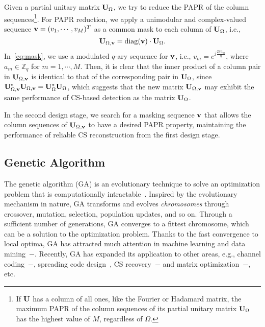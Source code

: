 \documentclass[journal]{IEEEtran}
\newcommand{\Z}{\ensuremath{\mathbb Z}}
\newcommand{\vbu}{{\bf v}}
\newcommand{\Ubu}{{\bf U}}
\numberwithin{const2}{const}
\begin{document}
Given a partial unitary matrix $\Ubu_\Omega$, 
we try to reduce the PAPR of
the column sequences\footnote{
If $\Ubu$ has a column of all ones, like the Fourier or Hadamard matrix,
the maximum PAPR of the column sequences of its partial unitary matrix $\Ubu_\Omega$ has the highest value of $M$,
regardless of $\Omega$.}.
For PAPR reduction, we apply
a unimodular and complex-valued sequence $\vbu = (v_1, \cdots, v_{M})^T$   
as a common mask to each column of $\Ubu_\Omega$, i.e.,
\begin{equation}\label{eq:mask}
\Ubu_{\Omega, \vbu}  
= {\rm diag} (\vbu) \cdot \Ubu_\Omega.
\end{equation}
In~\eqref{eq:mask}, we use
a modulated $q$-ary sequence for $\vbu$, i.e., $v_m = e^{j \frac{2 \pi a_m}{q}}$,
where $a_m \in \Z_q$ for $m=1, \cdots, M$.
Then, it is clear that the inner product of a column pair in $\Ubu_{\Omega, \vbu}$
is identical to that of the corresponding pair in $\Ubu_\Omega$, since
$\Ubu_{\Omega, \vbu} ^* \Ubu_{\Omega, \vbu} = \Ubu_\Omega ^* \Ubu_\Omega$,
which suggests that the new matrix $\Ubu_{\Omega, \vbu}$ may exhibit 
the same performance of CS-based detection as the matrix $\Ubu_\Omega$.

In the second design stage, we search for a masking sequence $\vbu$
that allows the column sequences of $\Ubu_{\Omega, \vbu}$ to have a desired PAPR property,
maintaining the performance of reliable CS reconstruction from the first design stage.




\subsection{Genetic Algorithm}
The genetic algorithm (GA) is an evolutionary technique
to solve an optimization problem that is computationally intractable~\cite{Holland:gen}.
Inspired by the evolutionary mechanism in nature,
GA transforms and evolves \emph{chromosomes} through crossover, mutation, selection, population updates, and so on.
Through a sufficient number of generations,
GA converges to a fittest chromosome, which can be a solution to the optimization problem. 
Thanks to the fast convergence to local optima,
GA has attracted much attention in machine learning and data mining~\cite{Freitas:survey}$-$\cite{Viv:intel}.
Recently, GA has expanded its application to other areas, e.g., %
channel coding~\cite{Hebbes:turbo}$-$\cite{brink:polar}, spreading code design~\cite{Dam:seq, Nat:evol},
CS recovery~\cite{Conde:sparse}$-$\cite{Erkoc:evol}
and matrix optimization~\cite{Chen:ISAR}$-$\cite{Leven:moga}, etc.
\end{document}
